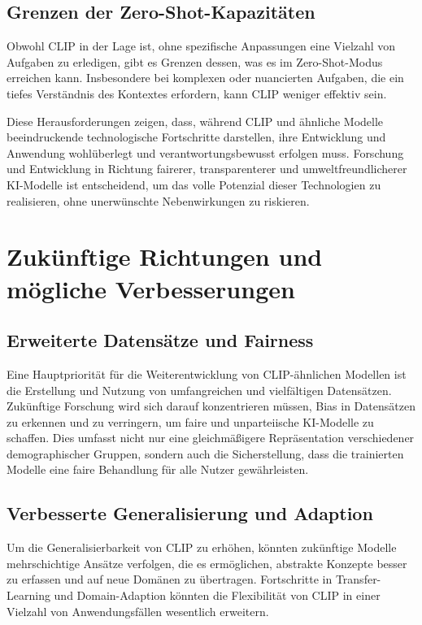 \documentclass[nolibertine, ngerman, algorithm, nomencl, minted]{ttlab-qualify}
\begin{document}
\subsection{Grenzen der Zero-Shot-Kapazitäten}
Obwohl CLIP in der Lage ist, ohne spezifische Anpassungen eine Vielzahl von Aufgaben zu erledigen, gibt es Grenzen dessen, 
was es im Zero-Shot-Modus erreichen kann. Insbesondere bei komplexen oder nuancierten Aufgaben, die ein tiefes Verständnis 
des Kontextes erfordern, kann CLIP weniger effektiv sein.

Diese Herausforderungen zeigen, dass, während CLIP und ähnliche Modelle beeindruckende technologische Fortschritte darstellen, 
ihre Entwicklung und Anwendung wohlüberlegt und verantwortungsbewusst erfolgen muss. Forschung und Entwicklung in Richtung fairerer, 
transparenterer und umweltfreundlicherer KI-Modelle ist entscheidend, um das volle Potenzial dieser Technologien zu realisieren, 
ohne unerwünschte Nebenwirkungen zu riskieren.

\section{Zukünftige Richtungen und mögliche Verbesserungen}
\subsection{Erweiterte Datensätze und Fairness}
Eine Hauptpriorität für die Weiterentwicklung von CLIP-ähnlichen Modellen ist die Erstellung und Nutzung von umfangreichen und 
vielfältigen Datensätzen. Zukünftige Forschung wird sich darauf konzentrieren müssen, Bias in Datensätzen zu erkennen und zu verringern, 
um faire und unparteiische KI-Modelle zu schaffen. Dies umfasst nicht nur eine gleichmäßigere Repräsentation verschiedener demographischer 
Gruppen, sondern auch die Sicherstellung, dass die trainierten Modelle eine faire Behandlung für alle Nutzer gewährleisten.

\subsection{Verbesserte Generalisierung und Adaption}
Um die Generalisierbarkeit von CLIP zu erhöhen, könnten zukünftige Modelle mehrschichtige Ansätze verfolgen, die es ermöglichen, 
abstrakte Konzepte besser zu erfassen und auf neue Domänen zu übertragen. Fortschritte in Transfer-Learning und Domain-Adaption könnten 
die Flexibilität von CLIP in einer Vielzahl von Anwendungsfällen wesentlich erweitern.
\end{document}
